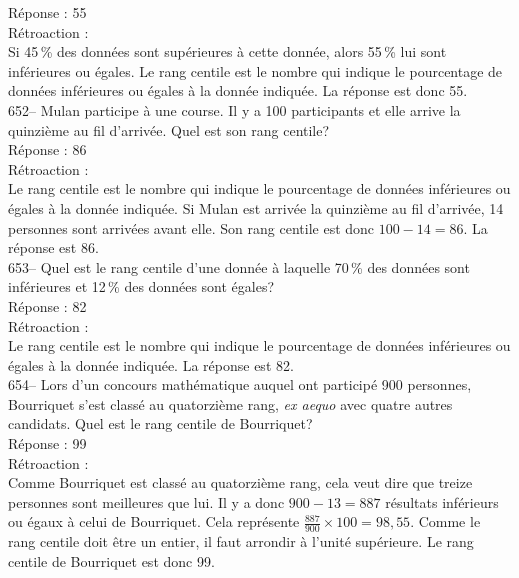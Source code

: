 ﻿\documentclass[letterpaper, 12pt]{article}
\begin{document}
R\'eponse : 55\\

R\'etroaction : \\
Si 45\,\% des donn\'ees sont sup\'erieures \`a cette donn\'ee, alors 55\,\%
lui sont inf\'erieures ou \'egales.  Le rang centile est le nombre qui
indique le pourcentage de donn\'ees inf\'erieures ou \'egales \`a la
donn\'ee indiqu\'ee.  La r\'eponse est donc 55.\\

652-- Mulan participe \`a une course.  Il y a 100 participants et elle
arrive la quinzi\`eme au fil d'arriv\'ee.  Quel est son rang centile?\\

R\'eponse : 86\\

R\'etroaction : \\
Le rang centile est le nombre qui indique le pourcentage de donn\'ees
inf\'erieures ou \'egales \`a la donn\'ee indiqu\'ee.  Si Mulan est
arriv\'ee la quinzi\`eme au fil d'arriv\'ee, 14 personnes sont arriv\'ees
avant elle.  Son rang centile est donc $100-14=86$.  La r\'eponse est 86.\\

653-- Quel est le rang centile d'une donn\'ee \`a laquelle 70\,\% des
donn\'ees sont inf\'erieures et 12\,\% des donn\'ees sont \'egales?\\

R\'eponse : 82\\

R\'etroaction : \\
Le rang centile est le nombre qui indique le pourcentage de donn\'ees
inf\'erieures ou \'egales \`a la donn\'ee indiqu\'ee.  La r\'eponse est
82.\\

654--  Lors d'un concours math\'ematique auquel ont particip\'e 900
personnes, Bourriquet s'est class\'e au quatorzi\`eme rang, \emph{ex aequo}
avec quatre autres candidats.  Quel est le rang centile de Bourriquet?\\

R\'eponse : 99\\

R\'etroaction : \\
Comme Bourriquet est class\'e au quatorzi\`eme rang, cela veut dire que
treize personnes sont meilleures que lui.  Il y a donc $900-13=887$
r\'esultats inf\'erieurs ou \'egaux \`a celui de Bourriquet.  Cela
repr\'esente $\frac{887}{900}\times100=98,55$.  Comme le rang centile doit
\^etre un entier, il faut arrondir \`a l'unit\'e sup\'erieure.  Le rang
centile de Bourriquet est donc 99.\\
\end{document}
